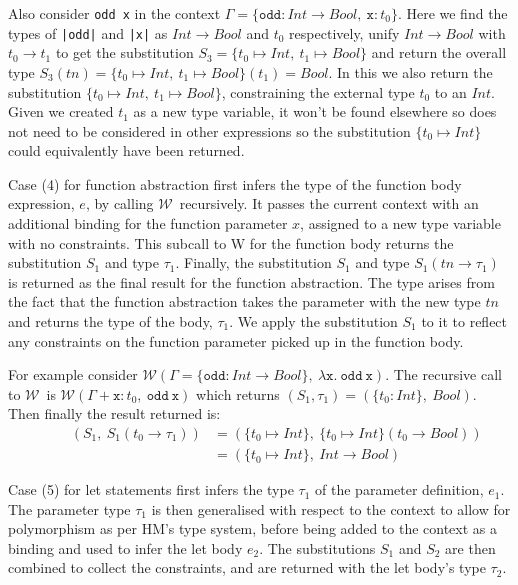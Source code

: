 \documentclass[a4paper,fleqn,oneside,12pt]{report}
\newcommand{\W}{$\mathcal{W}$}
\begin{document}
Also consider \texttt{odd x} in the context $\Gamma = \{ \mathtt{odd} : Int \rightarrow Bool,\ \mathtt{x} : t_0 \}$. Here we find the types of \texttt{|odd|} and \texttt{|x|} as $Int \rightarrow Bool$ and $t_0$ respectively, unify $Int \rightarrow Bool$ with $t_0 \rightarrow t_1$ to get the substitution $S_3 = \{ t_0 \mapsto Int,\ t_1 \mapsto Bool \}$ and return the overall type $S_3(tn) = \{ t_0 \mapsto Int,\ t_1 \mapsto Bool \}(t_1) = Bool$. In this we also return the substitution $\{ t_0 \mapsto Int,\ t_1 \mapsto Bool \}$, constraining the external type $t_0$ to an $Int$. Given we created $t_1$ as a new type variable, it won’t be found elsewhere so does not need to be considered in other expressions so the substitution $\{ t_0 \mapsto Int \}$ could equivalently have been returned.

Case (4) for function abstraction first infers the type of the function body expression, $e$, by calling \W\ recursively. It passes the current context with an additional binding for the function parameter $x$, assigned to a new type variable with no constraints. This subcall to W for the function body returns the substitution $S_1$ and type $\tau_1$. Finally, the substitution $S_1$ and type $S_1(tn \rightarrow \tau_1)$ is returned as the final result for the function abstraction. The type arises from the fact that the function abstraction takes the parameter with the new type $tn$ and returns the type of the body, $\tau_1$. We apply the substitution $S_1$ to it to reflect any constraints on the function parameter picked up in the function body.

For example consider $\mathcal{W}(\Gamma = \{ \mathtt{odd} : Int \rightarrow Bool \},\ \lambda\mathtt{x.\ odd\ x})$. The recursive call to \W\ is $\mathcal{W}(\Gamma + \mathtt{x} : t_0,\ \mathtt{odd\ x})$ which returns $(S_1, \tau_1) = (\{ t_0: Int \},\ Bool)$. Then finally the result returned is:
\begin{align*}
\hspace{1cm} (S_1,\ S_1(t_0 \rightarrow \tau_1))
& = (\{ t_0 \mapsto Int \},\ \{ t_0 \mapsto Int \}(t_0 \rightarrow Bool))\\
& = (\{ t_0 \mapsto Int \},\ Int \rightarrow Bool)
\end{align*}

Case (5) for let statements first infers the type $\tau_1$ of the parameter definition, $e_1$. The parameter type $\tau_1$ is then generalised with respect to the context to allow for polymorphism as per HM’s type system, before being added to the context as a binding and used to infer the let body $e_2$. The substitutions $S_1$ and $S_2$ are then combined to collect the constraints, and are returned with the let body’s type $\tau_2$.
\end{document}

